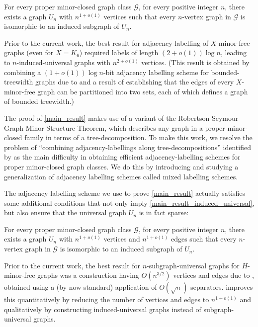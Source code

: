 \documentclass{patmorin}
\newcommand{\Oh}{O}
\newcommand{\calG}{\mathcal{G}}
\begin{document}
\begin{cor}\label{main_result_induced_universal}
  For every proper minor-closed graph class $\calG$, for every positive integer $n$,
  there exists a graph $U_n$ with $n^{1+o(1)}$ vertices such that every $n$-vertex graph in $\calG$ is isomorphic to an induced subgraph of $U_n$.
\end{cor}

Prior to the current work, the best result for adjacency labelling of $X$-minor-free graphs (even for $X=K_6$) required labels of length $(2+o(1))\log n$, leading to $n$-induced-universal graphs with $n^{2+o(1)}$ vertices.  (This result is obtained by combining a $(1+o(1))\log n$-bit adjacency labelling scheme for bounded-treewidth graphs due to \citet{gavoille.labourel:shorter} and a result of \citet{devos.ding.ea:excluding} establishing that the edges of every $X$-minor-free graph can be partitioned into two sets, each of which defines a graph of bounded treewidth.)  

The proof of \cref{main_result} makes use of a variant of the Robertson-Seymour Graph Minor Structure Theorem, which describes any graph in a proper minor-closed family in terms of a tree-decomposition.  To make this work, we resolve the problem of ``combining adjacency-labellings along tree-decompositions'' identified by \citet{BGP22} as the main difficulty in obtaining efficient adjacency-labelling schemes for proper minor-closed graph classes.  We do this by introducing and studying a generalization of adjacency labelling schemes called mixed labelling schemes. 

The adjacency labelling scheme we use to prove \cref{main_result} actually satisfies some additional conditions that not only imply \cref{main_result_induced_universal}, but also ensure that the universal graph $U_n$ is in fact sparse:
\begin{thm}\label{main_result_induced_universal_sparse}
    For every proper minor-closed graph class $\calG$, for every positive integer $n$,
    there exists a graph $U_n$ with $n^{1+o(1)}$ vertices and $n^{1+o(1)}$ edges such that every $n$-vertex graph in $\calG$ is isomorphic to an induced subgraph of $U_n$.
\end{thm}

Prior to the current work, the best result for $n$-subgraph-universal graphs for $H$-minor-free graphs was a construction having $\Oh(n^{3/2})$ vertices and edges due to \citet{babai.chung.ea:on}, obtained using a (by now standard) application of $O(\sqrt{n})$ separators.   improves this quantitatively by reducing the number of vertices and edges to $n^{1+o(1)}$ and qualitatively by constructing induced-universal graphs instead of subgraph-universal graphs.
\end{document}
